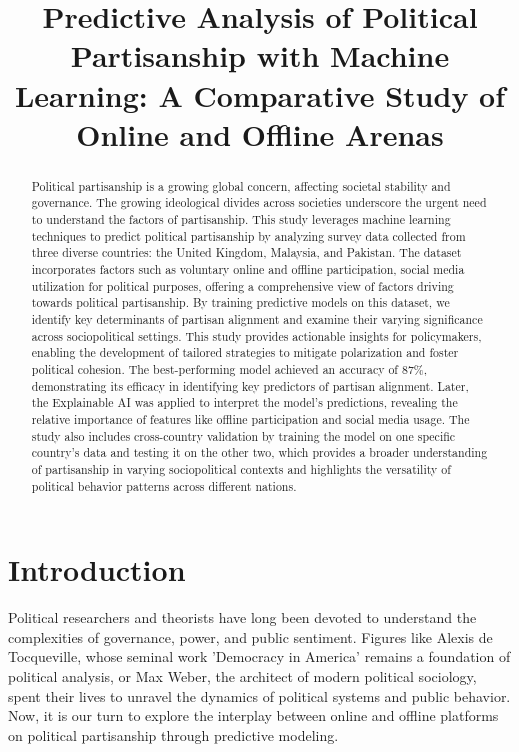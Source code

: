\documentclass[pt]{article}  %
\title{ Predictive Analysis of Political Partisanship with Machine Learning: A Comparative Study of Online and Offline Arenas}
\date{}
\begin{document}
\maketitle

\begin{abstract}
\large Political partisanship is a growing global concern, affecting societal stability and governance. The growing ideological divides across societies underscore the urgent need to understand the factors of partisanship. This study leverages machine learning techniques to predict political partisanship by analyzing survey data collected from three diverse countries: the United Kingdom, Malaysia, and Pakistan. The dataset incorporates factors such as voluntary online and offline participation, social media utilization for political purposes, offering a comprehensive view of factors driving towards political partisanship. By training predictive models on this dataset, we identify key determinants of partisan alignment and examine their varying significance across sociopolitical settings. This study provides actionable insights for policymakers, enabling the development of tailored strategies to mitigate polarization and foster political cohesion. The best-performing model achieved an accuracy of 87\%, demonstrating its efficacy in identifying key predictors of partisan alignment. Later, the Explainable AI was applied to interpret the model's predictions, revealing the relative importance of features like offline participation and social media usage. The study also includes cross-country validation by training the model on one specific country’s data and testing it on the other two, which provides a broader understanding of partisanship in varying sociopolitical contexts and highlights the versatility of political behavior patterns across different nations. 
\end{abstract}

\section{Introduction}
\large Political researchers and theorists have long been devoted to understand the complexities of governance, power, and public sentiment. Figures like Alexis de Tocqueville, whose seminal work 'Democracy in America' remains a foundation of political analysis, or Max Weber, the architect of modern political sociology, spent their lives to unravel the dynamics of political systems and public behavior. Now, it is our turn to explore the interplay between online and offline platforms on political partisanship through predictive modeling.
\end{document}
